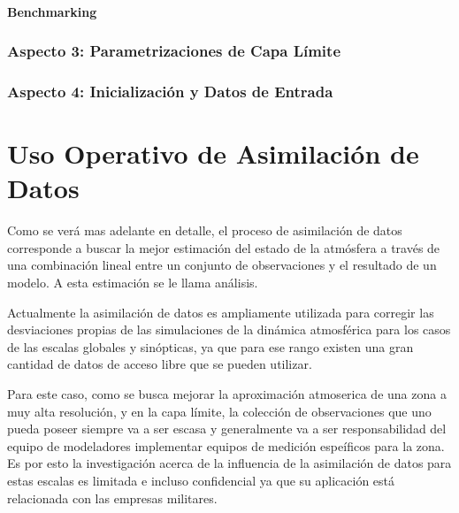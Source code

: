 \paragraph{Benchmarking}
\subsubsection{Aspecto 3: Parametrizaciones de Capa Límite}

\subsubsection{Aspecto 4: Inicialización y Datos de Entrada}

\section{Uso Operativo de Asimilación de Datos}

Como se verá mas adelante en detalle, el proceso de asimilación de datos corresponde a buscar la mejor  estimación del estado de la atmósfera a través de una combinación lineal entre un conjunto de observaciones y el resultado de un modelo. A esta estimación se le llama análisis.

Actualmente la asimilación de datos es ampliamente utilizada para corregir las desviaciones propias de las simulaciones de la dinámica atmosférica para los casos de las escalas globales y sinópticas, ya que para ese rango existen una gran cantidad de datos de acceso libre que se pueden utilizar.

Para este caso, como se busca mejorar la aproximación atmoserica de una zona a muy alta resolución, y en la capa límite, la colección de observaciones que uno pueda poseer siempre va a ser escasa y generalmente va a ser responsabilidad del equipo de modeladores implementar equipos de medición espeíficos para la zona. Es por esto la investigación acerca de la influencia de la asimilación de datos para estas escalas es limitada e incluso confidencial ya que su aplicación está relacionada con las empresas militares.



